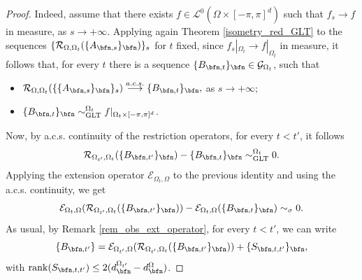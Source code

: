 \documentclass{amsart}
\begin{document}
\begin{proof}
    Indeed, assume that there exists $f\in\mathcal{L}^0(\Omega\times[-\pi,\pi]^d)$ such that $f_s\to f$ in measure, as $s\to+\infty$. Applying again Theorem \ref{isometry_red_GLT} to the sequences $\{\mathcal{R}_{\Omega,\Omega_t}(\{A_{\bfn,s}\}_\bfn)\}_s$ for $t$ fixed, since $f_s|_{\Omega_t}\to f|_{\Omega_t}$ in measure, it follows that, for every $t$ there is a sequence $\{B_{\bfn,t}\}_\bfn\in\mathcal{G}_{\Omega_t}$, such that
    \begin{itemize}
        \item $\mathcal{R}_{\Omega,\Omega_t}(\{\{A_{\bfn,s}\}_\bfn\}_s)\overset{a.c.s.}{\longrightarrow}\{B_{\bfn,t}\}_\bfn,$ as $s\to+\infty;$
        \item $\{B_{\bfn,t}\}_\bfn\sim_{\mathrm{GLT}}^{\Omega_t}f|_{\Omega_t\times[-\pi,\pi]^d}$.
    \end{itemize}
    Now, by a.c.s. continuity of the restriction operators, for every $t<t'$, it follows
    \begin{equation*}
        \mathcal{R}_{\Omega_{t'},\Omega_t}(\{B_{\bfn,t'}\}_\bfn)-\{B_{\bfn,t}\}_\bfn\sim_{\mathrm{GLT}}^{\Omega_t}0.
    \end{equation*}
    Applying the extension operator $\mathcal{E}_{\Omega_t,\Omega}$ to the previous identity and using the a.c.s. continuity, we get
    \begin{equation}\label{acs_eq_1}
        \mathcal{E}_{\Omega_t,\Omega}(\mathcal{R}_{\Omega_{t'},\Omega_t}(\{B_{\bfn,t'}\}_\bfn))-\mathcal{E}_{\Omega_t,\Omega}(\{B_{\bfn,t}\}_\bfn)\sim_{\sigma}0.
    \end{equation}
    As usual, by Remark \ref{rem_obs_ext_operator}, for every $t<t'$, we can write
    \begin{equation}\label{acs_eq_2}
        \{B_{\bfn,t'}\}=\mathcal{E}_{\Omega_{t'},\Omega}(\mathcal{R}_{\Omega_{t'},\Omega_t}(\{B_{\bfn,t'}\}_\bfn))+\{S_{\bfn,t,t'}\}_\bfn,
    \end{equation}
    with $\mathrm{rank}(S_{\bfn,t,t'})\leq 2(d_\bfn^{\Omega_{t'}}-d_\bfn^{\Omega})$.
    

\end{proof}
\end{document}
